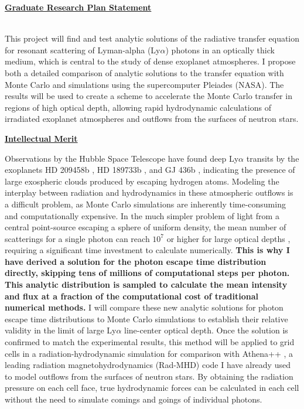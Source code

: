 \documentclass[11pt]{article}
\title{\vspace{-1.5in}}
\author{}
\date{}
\begin{document}
\maketitle

\thispagestyle{empty}
\centerline{\underline{\textbf{Graduate Research Plan Statement}}}

\noindent
\\ This project will find and test analytic solutions of the radiative transfer equation for resonant scattering of Lyman-alpha (Ly$\alpha$) photons in an optically thick medium, which is central to the study of dense exoplanet atmospheres. I propose both a detailed comparison of analytic solutions to the transfer equation with Monte Carlo and simulations using the supercomputer Pleiades (NASA). The results will be used to create a scheme to accelerate the Monte Carlo transfer in regions of high optical depth, allowing rapid hydrodynamic calculations of irradiated exoplanet atmospheres and outflows from the surfaces of neutron stars.

\noindent \textbf{\underline{Intellectual Merit}} 

Observations by the Hubble Space Telescope have found deep Ly$\alpha$ transits by the exoplanets HD 209458b \cite{2003Natur.422..143V}, HD 189733b \cite{2012A&A...543L...4L}, and  GJ 436b \cite{2015Natur.522..459E}, indicating the presence of large exospheric clouds produced by escaping hydrogen atoms. Modeling the interplay between radiation and hydrodynamics in these atmospheric outflows is a difficult problem, as Monte Carlo simulations are inherently time-consuming and computationally expensive. In the much simpler problem of light from a central point-source escaping a sphere of uniform density, the mean number of scatterings for a single photon can reach $10^{7}$ or higher for large optical depths \cite{inprep}, requiring a significant time investment to calculate numerically. \textbf{This is why I have derived a solution for the photon escape time distribution directly, skipping tens of millions of computational steps per photon. This analytic distribution is sampled to calculate the mean intensity and flux at a fraction of the computational cost of traditional numerical methods.} I will compare these new analytic solutions for photon escape time distributions to Monte Carlo simulations to establish their relative validity in the limit of large Ly$\alpha$ line-center optical depth. Once the solution is confirmed to match the experimental results, this method will be applied to grid cells in a radiation-hydrodynamic simulation for comparison with Athena++ \cite{2019ascl.soft12005S}, a leading radiation magnetohydrodynamics (Rad-MHD) code I have already used to model outflows from the surfaces of neutron stars. By obtaining the radiation pressure on each cell face, true hydrodynamic forces can be calculated in each cell without the need to simulate comings and goings of individual photons.
\end{document}
